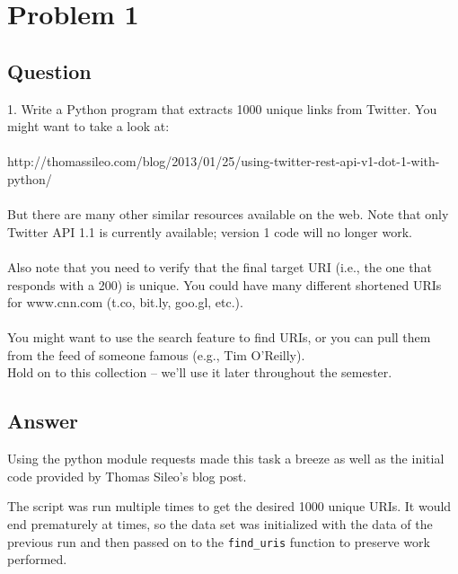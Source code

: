 \section{Problem 1}

\subsection{Question}
\vspace*{10pt}
1.  Write a Python program that extracts 1000 unique links from
Twitter.  You might want to take a look at:\\
\\
http://thomassileo.com/blog/2013/01/25/using-twitter-rest-api-v1-dot-1-with-python/\\
\\
But there are many other similar resources available on the web.  Note
that only Twitter API 1.1 is currently available; version 1 code will
no longer work.\\
\\
Also note that you need to verify that the final target URI (i.e., the
one that responds with a 200) is unique.  You could have many different
shortened URIs for www.cnn.com (t.co, bit.ly, goo.gl, etc.).\\
\\
You might want to use the search feature to find URIs, or you can
pull them from the feed of someone famous (e.g., Tim O'Reilly).\\
Hold on to this collection -- we'll use it later throughout the semester.

\subsection{Answer}
\vspace{5mm}
Using the python module requests made this task a breeze as well as the initial code provided by Thomas Sileo's blog post.
\vspace{2mm}

\vspace{1mm}
The script was run multiple times to get the desired 1000 unique URIs. It would end prematurely at times, so the data set was initialized with the data of the previous run and then passed on to the {\tt find\_uris} function to preserve work performed.
\vspace{5mm}

